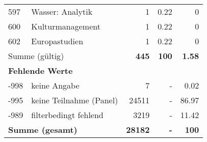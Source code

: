 \begin{longtable}{lXrrr}
        597 & \multicolumn{1}{X}{Wasser: Analytik} & %
          \num{1} &
          \num[round-mode=places,round-precision=2]{0,22} &
          \num[round-mode=places,round-precision=2]{0} \\

        600 & \multicolumn{1}{X}{Kulturmanagement} & %
          \num{1} &
          \num[round-mode=places,round-precision=2]{0,22} &
          \num[round-mode=places,round-precision=2]{0} \\

        602 & \multicolumn{1}{X}{Europastudien} & %
          \num{1} &
          \num[round-mode=places,round-precision=2]{0,22} &
          \num[round-mode=places,round-precision=2]{0} \\

     \midrule
     \multicolumn{2}{l}{Summe (gültig)} &
       \textbf{\num{445}} &
     \textbf{100} &
       \textbf{\num[round-mode=places,round-precision=2]{1,58}} \\
     \multicolumn{5}{l}{\textbf{Fehlende Werte}}\\
       -998 &
       keine Angabe &
         \num{7} &
        - &
         \num[round-mode=places,round-precision=2]{0,02} \\
       -995 &
       keine Teilnahme (Panel) &
         \num{24511} &
        - &
         \num[round-mode=places,round-precision=2]{86,97} \\
       -989 &
       filterbedingt fehlend &
         \num{3219} &
        - &
         \num[round-mode=places,round-precision=2]{11,42} \\
     \midrule
     \multicolumn{2}{l}{\textbf{Summe (gesamt)}} &
          \textbf{\num{28182}} &
        \textbf{-} &
        \textbf{100} \\
     \bottomrule
     \end{longtable}
     
